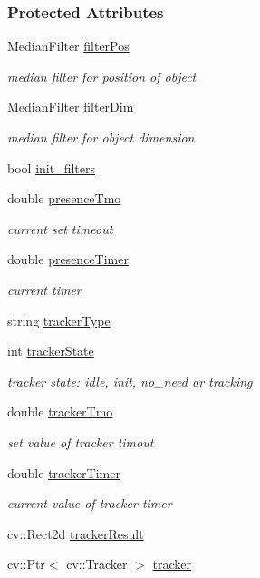 \subsubsection*{Protected Attributes}
\begin{DoxyCompactItemize}
\item 
Median\+Filter \hyperlink{group__iol2opc_a93bdd7472a32538399030d0366a3f5d0}{filter\+Pos}
\begin{DoxyCompactList}\small\item\em median filter for position of object \end{DoxyCompactList}\item 
Median\+Filter \hyperlink{group__iol2opc_a6c5b58b7df86ea40ed804ba9fcb4bb12}{filter\+Dim}
\begin{DoxyCompactList}\small\item\em median filter for object dimension \end{DoxyCompactList}\item 
bool \hyperlink{group__iol2opc_a3e7d6f87a6909d2bf3b6e86bcda4c117}{init\+\_\+filters}
\item 
double \hyperlink{group__iol2opc_adbb799c2540094cc2b0cbb14562f0809}{presence\+Tmo}
\begin{DoxyCompactList}\small\item\em current set timeout \end{DoxyCompactList}\item 
double \hyperlink{group__iol2opc_ad867e2f12963dec2c6ee462a2b9ac838}{presence\+Timer}
\begin{DoxyCompactList}\small\item\em current timer \end{DoxyCompactList}\item 
string \hyperlink{group__iol2opc_a08dfc6b6b77b90ae16bd275b1f0ebd7b}{tracker\+Type}
\item 
int \hyperlink{group__iol2opc_a540982aca760bdd3706ddb058860a87c}{tracker\+State}
\begin{DoxyCompactList}\small\item\em tracker state\+: idle, init, no\+\_\+need or tracking \end{DoxyCompactList}\item 
double \hyperlink{group__iol2opc_aa609241dfe0304c989c0c5a4d953da3c}{tracker\+Tmo}
\begin{DoxyCompactList}\small\item\em set value of tracker timout \end{DoxyCompactList}\item 
double \hyperlink{group__iol2opc_a6bcc5eeb63f6f97848bfdb35d0d0d383}{tracker\+Timer}
\begin{DoxyCompactList}\small\item\em current value of tracker timer \end{DoxyCompactList}\item 
cv\+::\+Rect2d \hyperlink{group__iol2opc_a0451afb5147a6f0f3fa37e8c1d575d18}{tracker\+Result}
\item 
cv\+::\+Ptr$<$ cv\+::\+Tracker $>$ \hyperlink{group__iol2opc_ae7e7e36f0cf21bee692712195187ce3f}{tracker}
\end{DoxyCompactItemize}


